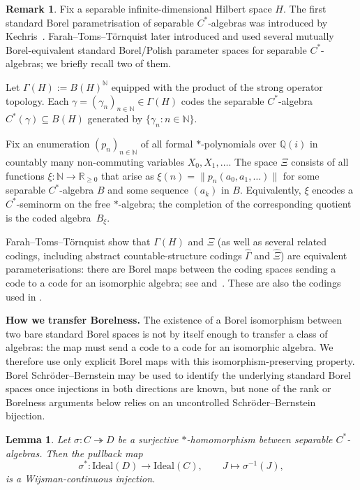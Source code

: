 \documentclass[12pt,fleqn,a4paper]{amsart}
\renewcommand{\ge}{\geqslant}
\numberwithin{equation}{section}
\newtheorem{lemma}[theorem]{Lemma}
\theoremstyle{definition}
\newtheorem{remark}[theorem]{Remark}
\newcommand{\N}{\mathbb{N}}
\newcommand{\Q}{\mathbb{Q}}
\newcommand{\R}{\mathbb{R}}
\newcommand{\Ideal}{\mathrm{Ideal}}
\begin{document}
\begin{remark}
\label{rem:other-codings}
Fix a separable infinite-dimensional Hilbert space $H$.
The first standard Borel parametrisation of separable $C^*$-algebras was introduced
by Kechris~\cite{KechrisAsianCstar}.  Farah--Toms--T\"ornquist later introduced and
used several mutually Borel-equivalent standard Borel/Polish parameter spaces for
separable $C^*$-algebras; we briefly recall two of them.

\smallskip
{}
Let $\Gamma(H):=B(H)^{\N}$ equipped with the product of the strong operator topology.
Each $\gamma=(\gamma_n)_{n\in\N}\in\Gamma(H)$ codes the separable $C^*$-algebra
$C^*(\gamma)\subseteq B(H)$ generated by $\{\gamma_n:n\in\N\}$.

\smallskip
{}
Fix an enumeration $(p_n)_{n\in\N}$ of all formal $*$-polynomials over $\Q(i)$
in countably many non-commuting variables $X_0,X_1,\dots$.
The space $\Xi$ consists of all functions
$\xi:\N\to\R_{\ge 0}$ that arise as
$\xi(n)=\|p_n(a_0,a_1,\dots)\|$
for some separable $C^*$-algebra $B$ and some sequence $(a_k)$ in $B$.
Equivalently, $\xi$ encodes a $C^*$-seminorm on the free $*$-algebra;
the completion of the corresponding quotient is the coded algebra~$B_\xi$.

\smallskip
Farah--Toms--T\"ornquist show that $\Gamma(H)$ and $\Xi$ (as well as several related
codings, including abstract countable-structure codings $\widehat\Gamma$ and
$\widehat\Xi$) are equivalent parameterisations: there are Borel maps between the
coding spaces sending a code to a code for an isomorphic algebra; see
\cite[Section~2]{FarahTomsTornquistCrelle} and~\cite{FarahTomsTornquist}.
These are also the codings used in
\cite{ElliottFarahPaulsenRosendalTomsTornquist}.

\smallskip\noindent
\textbf{How we transfer Borelness.}
The existence of a Borel isomorphism between two bare standard Borel spaces is not by
itself enough to transfer a class of algebras: the map must send a code to a code for
an isomorphic algebra.  We therefore use only explicit Borel maps with this
isomorphism-preserving property.  Borel Schr\"oder--Bernstein may be used to identify
the underlying standard Borel spaces once injections in both directions are known, but
none of the rank or Borelness arguments below relies on an uncontrolled
Schr\"oder--Bernstein bijection.
\end{remark}

\begin{lemma}
\label{lem:pullback-ideals}
Let $\sigma:C\twoheadrightarrow D$ be a surjective $*$-homomorphism between separable
$C^*$-algebras.  Then the pullback map
\[
\sigma^*:\Ideal(D)\to\Ideal(C),\qquad J\mapsto\sigma^{-1}(J),
\]
is a Wijsman-continuous injection.
\end{lemma}
\end{document}
